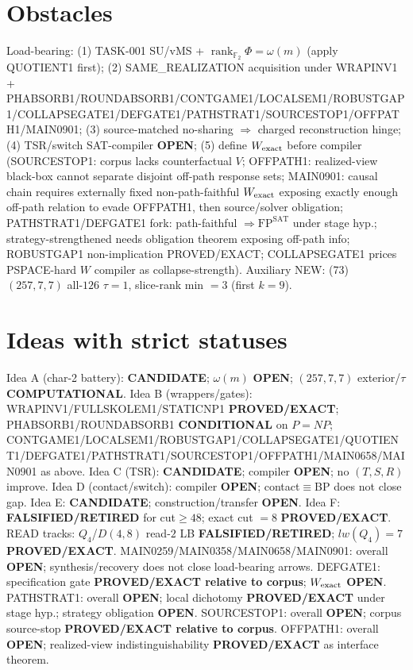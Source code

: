 \documentclass[11pt]{article}
\begin{document}
\section*{Obstacles}
Load-bearing: (1) TASK-001 SU/vMS + $\operatorname{rank}_{\mathbb F_2}\Phi=\omega(m)$ (apply QUOTIENT1 first);
(2) SAME\_REALIZATION acquisition under WRAPINV1 + PHABSORB1/ROUNDABSORB1/CONTGAME1/LOCALSEM1/ROBUSTGAP1/COLLAPSEGATE1/DEFGATE1/PATHSTRAT1/SOURCESTOP1/OFFPATH1/MAIN0901;
(3) source-matched no-sharing $\Rightarrow$ charged reconstruction hinge;
(4) TSR/switch SAT-compiler \textbf{OPEN};
(5) define $W_{\rm exact}$ before compiler (SOURCESTOP1: corpus lacks counterfactual $V$;
OFFPATH1: realized-view black-box cannot separate disjoint off-path response sets;
MAIN0901: causal chain requires externally fixed non-path-faithful $W_{\rm exact}$ exposing
exactly enough off-path relation to evade OFFPATH1, then source/solver obligation;
PATHSTRAT1/DEFGATE1 fork: path-faithful $\Rightarrow\mathrm{FP}^{\mathrm{SAT}}$ under stage hyp.;
strategy-strengthened needs obligation theorem exposing off-path info;
ROBUSTGAP1 non-implication PROVED/EXACT; COLLAPSEGATE1 prices PSPACE-hard $W$ compiler as collapse-strength).
Auxiliary NEW: (73) $(257,7,7)$ all-$126$ $\tau{=}1$, slice-rank min $=3$ (first $k{=}9$).

\section*{Ideas with strict statuses}
Idea A (char-2 battery): \textbf{CANDIDATE}; $\omega(m)$ \textbf{OPEN}; $(257,7,7)$ exterior/$\tau$ \textbf{COMPUTATIONAL}.
Idea B (wrappers/gates): WRAPINV1/FULLSKOLEM1/STATICNP1 \textbf{PROVED/EXACT};
PHABSORB1/ROUNDABSORB1 \textbf{CONDITIONAL} on $P=NP$;
CONTGAME1/LOCALSEM1/ROBUSTGAP1/COLLAPSEGATE1/QUOTIENT1/DEFGATE1/PATHSTRAT1/SOURCESTOP1/OFFPATH1/MAIN0658/MAIN0901 as above.
Idea C (TSR): \textbf{CANDIDATE}; compiler \textbf{OPEN}; no $(T,S,R)$ improve.
Idea D (contact/switch): compiler \textbf{OPEN}; contact$\equiv$BP does not close gap.
Idea E: \textbf{CANDIDATE}; construction/transfer \textbf{OPEN}.
Idea F: \textbf{FALSIFIED/RETIRED} for cut$\ge48$; exact cut $=8$ \textbf{PROVED/EXACT}.
READ tracks: $Q_4$/$D(4,8)$ read-$2$ LB \textbf{FALSIFIED/RETIRED}; $lw(Q_4)=7$ \textbf{PROVED/EXACT}.
MAIN0259/MAIN0358/MAIN0658/MAIN0901: overall \textbf{OPEN}; synthesis/recovery does not close load-bearing arrows.
DEFGATE1: specification gate \textbf{PROVED/EXACT relative to corpus}; $W_{\rm exact}$ \textbf{OPEN}.
PATHSTRAT1: overall \textbf{OPEN}; local dichotomy \textbf{PROVED/EXACT} under stage hyp.; strategy obligation \textbf{OPEN}.
SOURCESTOP1: overall \textbf{OPEN}; corpus source-stop \textbf{PROVED/EXACT relative to corpus}.
OFFPATH1: overall \textbf{OPEN}; realized-view indistinguishability \textbf{PROVED/EXACT} as interface theorem.
\end{document}
